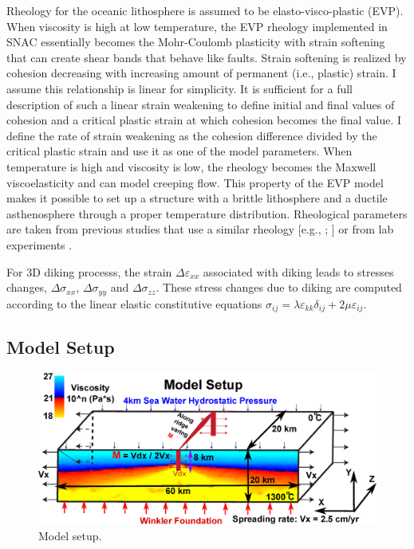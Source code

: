 Rheology for the oceanic lithosphere is assumed to be elasto-visco-plastic (EVP). When viscosity is high at low temperature, the EVP rheology implemented in SNAC essentially becomes the Mohr-Coulomb plasticity with strain softening that can create shear bands that behave like faults. Strain softening is realized by cohesion decreasing with increasing amount of permanent (i.e., plastic) strain. I assume this relationship is linear for simplicity. It is sufficient for a full description of such a linear strain weakening to define initial and final values of cohesion and a critical plastic strain at which cohesion becomes the final value. I define the rate of strain weakening as the cohesion difference divided by the critical plastic strain and use it as one of the model parameters. When temperature is high and viscosity is low, the rheology becomes the Maxwell viscoelasticity and can model creeping flow. This property of the EVP model makes it possible to set up a structure with a brittle lithosphere and a ductile asthenosphere through a proper temperature distribution. Rheological parameters are taken from previous studies that use a similar rheology [e.g., \citealp{Buck2005}; \citealp{Tucholke2008}] or from lab experiments \citep[e.g.,][]{Kirby1987}. 

For 3D diking processs, the strain $\Delta\varepsilon_{xx}$ associated with diking leads to stresses changes, $\Delta\sigma_{xx}$, $\Delta\sigma_{yy}$ and $\Delta\sigma_{zz}$. These stress changes due to diking are computed according to the linear elastic constitutive equations $\sigma_{ij}=\lambda\varepsilon_{kk}\delta_{ij}+2\mu\varepsilon_{ij}$.

\subsection{Model Setup}

\begin{figure}[h]
 \centering
  \includegraphics[width=1.0\textwidth] {./Figures/fig_Methods_Model_Setup.eps}
 \caption{Model setup.}
 \label{fig_Methods8_1}
\end{figure}

